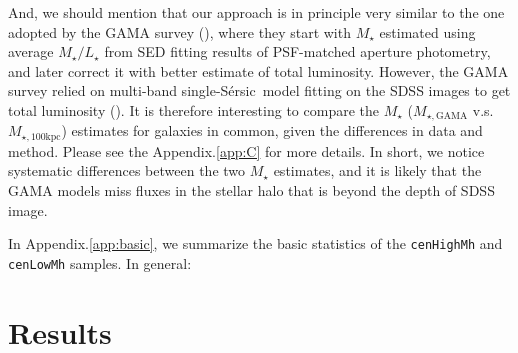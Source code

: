 \documentclass{emulateapj}
\def\ser{{S\'{e}rsic\ }}
\def\rbcg{\texttt{cenHighMh}}
\def\nbcg{\texttt{cenLowMh}}
\def\mstar{{$M_{\star}$}}
\def\minn{{$M_{\star,10\mathrm{kpc}}$}}
\def\mtot{{$M_{\star,100\mathrm{kpc}}$}}
\def\mgama{{$M_{\star,\mathrm{GAMA}}$}}
\def\logminn{{$\log (M_{\star,10\mathrm{kpc}}/M_{\odot})$}}
\def\logmtot{{$\log (M_{\star,100\mathrm{kpc}}/M_{\odot})$}}
\def\m2l{{$M_{\star}/L_{\star}$}}
\def\mden{{$\mu_{\star}$}}
\newcommand{\update}[1]{\textcolor{Bittersweet}{#1}}
\begin{document}
\begin{CJK*}{UTF8}{gbsn}
    And, we should mention that our approach is in principle very similar to the 
    one adopted by the GAMA survey (\citealt{Taylor2011}), where they start with 
    \mstar{} estimated using average \m2l{} from SED fitting results of
    PSF-matched aperture photometry, and later correct it with better estimate 
    of total luminosity.  
    However, the GAMA survey relied on multi-band single-\ser model fitting on 
    the SDSS images to get total luminosity (\citealt{Kelvin2012}). 
    It is therefore interesting to compare the \mstar{} (\mgama{} v.s. \mtot{})
    estimates for galaxies in common, given the differences in data and method. 
    Please see the Appendix.\ref{app:C} for more details. 
    In short, we notice systematic differences between the two \mstar{} estimates, 
    and it is likely that the GAMA models miss fluxes in the stellar halo that 
    is beyond the depth of SDSS image. 
    
    \update{In Appendix.\ref{app:basic}, we summarize the basic statistics of 
    the \rbcg{} and \nbcg{} samples.  In general:}
    


    

\section{Results}
    \label{sec:result}
    

\end{CJK*}
\end{document}
